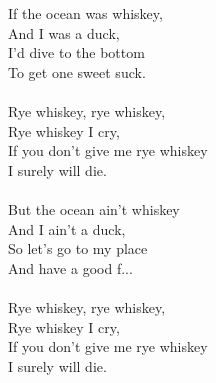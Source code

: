
If the ocean was whiskey, \\ And I was a duck, \\ I'd dive to the bottom \\ To get one sweet suck. \\ \hspace{10mm} \\ Rye whiskey, rye whiskey, \\ Rye whiskey I cry, \\ If you don't give me rye whiskey \\ I surely will die. \\ \hspace{10mm} \\ But the ocean ain't whiskey \\ And I ain't a duck, \\ So let's go to my place \\ And have a good f... \\ \hspace{10mm} \\ Rye whiskey, rye whiskey, \\ Rye whiskey I cry, \\ If you don't give me rye whiskey \\ I surely will die.
